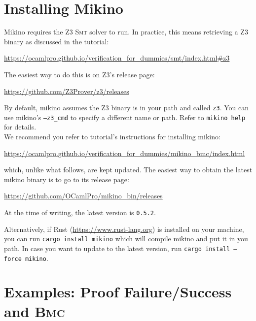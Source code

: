 \documentclass{easychair}
\newcommand{\Mkn}{Mikino}
\newcommand{\mkn}{mikino}
\newcommand{\rust}{Rust}
\newcommand{\smt}{\textsc{Smt}}
\newcommand{\bmc}{\textsc{Bmc}}
\newcommand{\code}[1]{\textcolor{orange!75!black}{\texttt{#1}}}
\begin{document}
\appendix

\section{Installing \Mkn{}}%
\label{app:install}

\Mkn{} requires the Z3 \smt{} solver to run. In practice, this means retrieving a Z3 binary as
discussed in the tutorial:
%
\begin{center}
    \url{https://ocamlpro.github.io/verification_for_dummies/smt/index.html\#z3}
\end{center}
%
The easiest way to do this is on Z3's release page:
%
\begin{center}
    \url{https://github.com/Z3Prover/z3/releases}
\end{center}
%
By default, \mkn{} assumes the Z3 binary is in your path and called \code{z3}. You can use \mkn{}'s
\code{--z3\_cmd} to specify a different name or path. Refer to \code{mikino help} for details.
%
\\
%
We recommend you refer to tutorial's instructions for installing \mkn{}:
%
\begin{center}
    \url{https://ocamlpro.github.io/verification_for_dummies/mikino_bmc/index.html}%
\end{center}
%
which, unlike what follows, are kept updated. The easiest way to obtain the latest \mkn{} binary is
to go to its release page:
%
\begin{center}
    \url{https://github.com/OCamlPro/mikino_bin/releases}
\end{center}
%
At the time of writing, the latest version is \code{0.5.2}.

Alternatively, if \rust{} (\url{https://www.rust-lang.org}) is installed on your machine, you can
run \code{cargo install mikino} which will compile \mkn{} and put it in you path. In case you want
to update to the latest version, run \code{cargo install --force mikino}.

\section{Examples: Proof Failure/Success and \bmc{}}%
\label{app:example}
\end{document}

